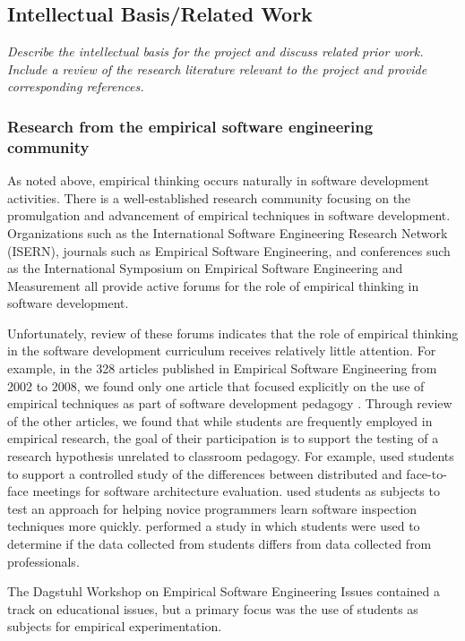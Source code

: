 \subsection{Intellectual Basis/Related Work}

{\em Describe the intellectual basis for the project and discuss related
prior work.  Include a review of the research literature relevant to the
project and provide corresponding references. }

\bigskip

\subsubsection{Research from the empirical software engineering community}

As noted above, empirical thinking occurs naturally in software development
activities.  There is a well-established research community focusing on the
promulgation and advancement of empirical techniques in software
development.  Organizations such as the International Software Engineering
Research Network (ISERN), journals such as Empirical Software Engineering,
and conferences such as the International Symposium on Empirical Software
Engineering and Measurement all provide active forums for the role of
empirical thinking in software development.

Unfortunately, review of these forums indicates that the role of empirical
thinking in the software development curriculum receives relatively little
attention.  For example, in the 328 articles published in Empirical
Software Engineering from 2002 to 2008, we found only one article that
focused explicitly on the use of empirical techniques as part of software
development pedagogy \citep{Pfahl03}.  Through review of the other
articles, we found that while students are frequently employed in empirical
research, the goal of their participation is to support the testing of a
research hypothesis unrelated to classroom pedagogy.  For example,
\cite{Babar08} used students to support a controlled study of the
differences between distributed and face-to-face meetings for software
architecture evaluation.  \cite{Carver06} used students as subjects to test
an approach for helping novice programmers learn software inspection
techniques more quickly.  \cite{Host00} performed a study in which students
were used to determine if the data collected from students differs from
data collected from professionals.

The Dagstuhl Workshop on Empirical Software Engineering Issues
\cite{Basili06} contained a track on educational issues, but a primary
focus was the use of students as subjects for empirical experimentation.

